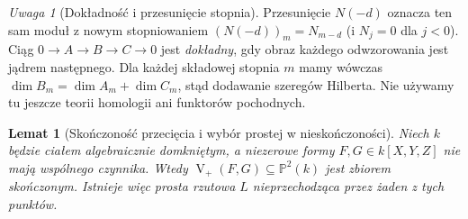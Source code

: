 \documentclass[11pt,a4paper,openany]{report}
\numberwithin{equation}{section}
\theoremstyle{plain}
\newtheorem{lemat}[twierdzenie]{Lemat}
\theoremstyle{definition}
\theoremstyle{remark}
\newtheorem{uwaga}[twierdzenie]{Uwaga}
\newcommand{\PP}{\mathbb P}
\newcommand{\V}{\operatorname V}
\begin{document}
\begin{uwaga}[Dokładność i przesunięcie stopnia]
Przesunięcie $N(-d)$ oznacza ten sam moduł z nowym
stopniowaniem $(N(-d))_m=N_{m-d}$ (i $N_j=0$ dla $j<0$).
Ciąg $0\to A\to B\to C\to0$ jest \emph{dokładny},
gdy obraz każdego odwzorowania jest jądrem następnego.
Dla każdej składowej stopnia $m$ mamy wówczas
$\dim B_m=\dim A_m+\dim C_m$, stąd dodawanie
szeregów Hilberta. Nie używamy tu jeszcze teorii
homologii ani funktorów pochodnych.
\end{uwaga}

\begin{lemat}[Skończoność przecięcia i wybór prostej w nieskończoności]
\label{lem:finiteness-plane-intersection}
Niech $k$ będzie ciałem algebraicznie domkniętym, a niezerowe
formy $F,G\in k[X,Y,Z]$ nie mają wspólnego czynnika.
Wtedy $\V_+(F,G)\subseteq\PP^2(k)$ jest zbiorem skończonym.
Istnieje więc prosta rzutowa $L$ nieprzechodząca przez
żaden z tych punktów.
\end{lemat}
\end{document}
